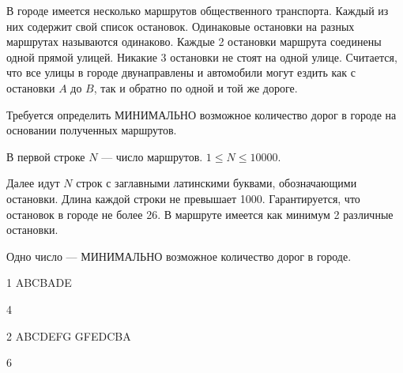 
В городе имеется несколько маршрутов общественного транспорта. Каждый из них содержит свой список остановок. Одинаковые остановки на разных маршрутах называются одинаково. Каждые 2 остановки маршрута соединены одной прямой улицей. Никакие 3 остановки не стоят на одной улице. Считается, что все улицы в городе двунаправлены и автомобили могут ездить как с остановки $A$ до $B$, так и обратно по одной и той же дороге.

Требуется определить МИНИМАЛЬНО возможное количество дорог в городе на основании полученных маршрутов.


В первой строке $N$ — число маршрутов. $1\leq N\leq 10000$.

Далее идут $N$ строк с заглавными латинскими буквами, обозначающими остановки. Длина каждой строки не превышает 1000. Гарантируется, что остановок в городе не более 26. В маршруте имеется как минимум 2 различные остановки.

\outputfmtSection

Одно число — МИНИМАЛЬНО возможное количество дорог в городе.


\begin{myverbbox}[\small]{\vinput}
    1
    ABCBADE
\end{myverbbox}
\begin{myverbbox}[\small]{\voutput}
    4 
\end{myverbbox}


\begin{myverbbox}[\small]{\vinput}
    2
    ABCDEFG
    GFEDCBA
\end{myverbbox}
\begin{myverbbox}[\small]{\voutput}
    6
\end{myverbbox}


